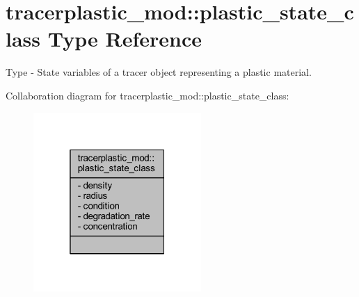 \hypertarget{structtracerplastic__mod_1_1plastic__state__class}{}\section{tracerplastic\+\_\+mod\+:\+:plastic\+\_\+state\+\_\+class Type Reference}
\label{structtracerplastic__mod_1_1plastic__state__class}


Type -\/ State variables of a tracer object representing a plastic material.  




Collaboration diagram for tracerplastic\+\_\+mod\+:\+:plastic\+\_\+state\+\_\+class\+:\nopagebreak
\begin{figure}[H]
\begin{center}
\leavevmode
\includegraphics[width=181pt]{structtracerplastic__mod_1_1plastic__state__class__coll__graph}
\end{center}
\end{figure}
